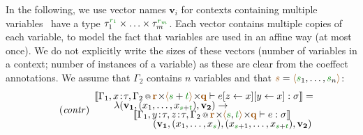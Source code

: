 In the following, we use vector names $\mathbf{v}_i$ for contexts containing multiple variables
\ie~have a type $\tau_1^{\cclrd{r_1}}\times\ldots\times\tau_m^{\cclrd{r_m}}$. Each vector contains 
multiple copies of each variable, to model the fact that variables are used in an affine way (at most 
once). We do not explicitly write the sizes of these vectors (number of variables in a context; number 
of instances of a variable) as these are clear from the coeffect annotations. We assume that $\Gamma_2$ 
contains $n$ variables and that $\aclrd{s}=\alift{\cclrd{s}_1, \ldots, \cclrd{s}_n}$:
%
\begin{equation*}
\hspace{-0.5em}
\tag{\emph{contr}}
\begin{array}{l}
\sem{\coctx{\Gamma_1,x\!:\!\tau,\Gamma_2}{\aclrd{\textbf{r}} \cons \alift{\cclrd{s}+\cclrd{t}} \cons \aclrd{\textbf{q}}} \vdash \subst{\subst{e}{z}{x}}{y}{x} : \sigma} =\\[-0.25em] 
\qquad  \lambda(\mathbf{v_1}, (x_1, \ldots, x_{\cclrd{s}+\cclrd{t}}), \mathbf{v_2}) \rightarrow \\[-0.25em]
\qquad\qquad\sem{\coctx{\Gamma_1,y\!:\!\tau,z\!:\!\tau,\Gamma_2}{\aclrd{\textbf{r}} \cons \alift{\cclrd{s},\cclrd{t}} \cons \aclrd{\textbf{q}}} \vdash e : \sigma}\\[-0.25em]
\qquad\qquad\qquad (\mathbf{v_1}, (x_1, \ldots, x_{\cclrd{s}}), (x_{\cclrd{s}+1}, \ldots, x_{\cclrd{s}+\cclrd{t}} ), \mathbf{v_2})
\end{array}
\end{equation*}
%
